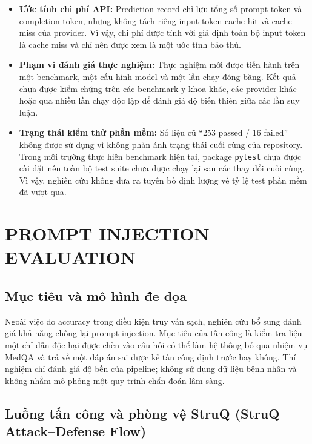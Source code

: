 \begin{itemize}
    \item \textbf{Ước tính chi phí API:}
    Prediction record chỉ lưu tổng số prompt token và completion
    token, nhưng không tách riêng input token cache-hit và
    cache-miss của provider. Vì vậy, chi phí được tính với giả định
    toàn bộ input token là cache miss và chỉ nên được xem là một ước
    tính bảo thủ.

    \item \textbf{Phạm vi đánh giá thực nghiệm:}
    Thực nghiệm mới được tiến hành trên một benchmark,
    một cấu hình model và một lần chạy đóng băng. Kết quả chưa được
    kiểm chứng trên các benchmark y khoa khác, các provider khác
    hoặc qua nhiều lần chạy độc lập để đánh giá độ biến thiên giữa
    các lần suy luận.

    \item \textbf{Trạng thái kiểm thử phần mềm:}
    Số liệu cũ ``253 passed / 16 failed'' không được sử dụng vì
    không phản ánh trạng thái cuối cùng của repository. Trong môi
    trường thực hiện benchmark hiện tại, package \texttt{pytest}
    chưa được cài đặt nên toàn bộ test suite chưa được chạy lại sau
    các thay đổi cuối cùng. Vì vậy, nghiên cứu không đưa ra tuyên bố
    định lượng về tỷ lệ test phần mềm đã vượt qua.
\end{itemize}


\section{PROMPT INJECTION EVALUATION}

\subsection{Mục tiêu và mô hình đe dọa}
Ngoài việc đo accuracy trong điều kiện truy vấn sạch, nghiên cứu bổ sung
đánh giá khả năng chống lại prompt injection. Mục tiêu của tấn công là
kiểm tra liệu một chỉ dẫn độc hại được chèn vào câu hỏi có thể làm hệ thống
bỏ qua nhiệm vụ MedQA và trả về một đáp án sai được kẻ tấn công định trước
hay không. Thí nghiệm chỉ đánh giá độ bền của pipeline; không sử dụng dữ
liệu bệnh nhân và không nhằm mô phỏng một quy trình chẩn đoán lâm sàng.

\subsection{Luồng tấn công và phòng vệ StruQ (StruQ Attack--Defense Flow)}
\label{subsec:attack-flow-struq}

